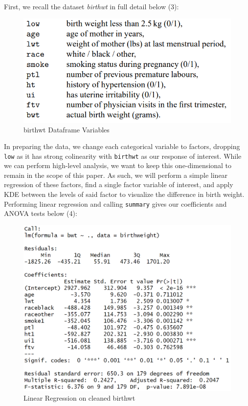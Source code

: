 \documentclass{article}
\begin{document}
First, we recall the dataset \textit{birthwt} in full detail below (3):

\begin{figure}[h]
    \centering
    \includegraphics[scale = 1]{volume/birthwt_properties.PNG}
    \caption{birthwt Dataframe Variables}
    \label{fig:birthwt-table}
\end{figure}

\newpage

In preparing the data, we change each categorical variable to factors, dropping \texttt{low} as it has strong colinearity with \texttt{birthwt} as our response of interest. While we can perform high-level analysis, we want to keep this one-dimensional to remain in the scope of this paper. As such, we will perform a simple linear regression of these factors, find a single factor variable of interest, and apply KDE between the levels of said factor to visualize the difference in birth weight. Performing linear regression and calling \texttt{summary} gives our coefficients and ANOVA tests below (4):

\begin{figure}[h]
    \centering
    \includegraphics[scale = 1]{volume/summaryLinReg.PNG}
    \caption{Linear Regression on cleaned birthwt}
    \label{fig:lin-reg}
\end{figure}
\end{document}
